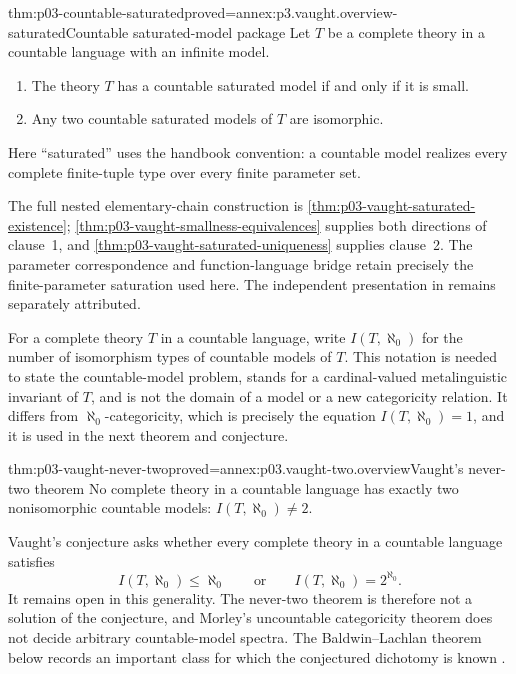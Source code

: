 \begin{hbtheorem}{thm:p03-countable-saturated}{proved=annex:p3.vaught.overview-saturated}{Countable saturated-model package}
Let \(T\) be a complete theory in a countable language with an infinite
model.
\begin{enumerate}
  \item The theory \(T\) has a countable saturated model if and only if it is
        small.
  \item Any two countable saturated models of \(T\) are isomorphic.
\end{enumerate}
Here ``saturated'' uses the handbook convention: a countable model realizes
every complete finite-tuple type over every finite parameter set.
\end{hbtheorem}

The full nested elementary-chain construction is
\cref{thm:p03-vaught-saturated-existence};
\cref{thm:p03-vaught-smallness-equivalences} supplies both directions of
clause~1, and \cref{thm:p03-vaught-saturated-uniqueness} supplies clause~2.
The parameter correspondence and function-language bridge retain precisely
the finite-parameter saturation used here. The independent presentation in
\cite{Marker2002} remains separately attributed.

For a complete theory \(T\) in a countable language, write
\(I(T,\aleph_0)\) for the number of isomorphism types of countable models of
\(T\).  This notation is needed to state the countable-model problem, stands
for a cardinal-valued metalinguistic invariant of \(T\), and is not the domain
of a model or a new categoricity relation.  It differs from
\(\aleph_0\)-categoricity, which is precisely the equation
\(I(T,\aleph_0)=1\), and it is used in the next theorem and conjecture.

\begin{hbtheorem}{thm:p03-vaught-never-two}{proved=annex:p03.vaught-two.overview}{Vaught's never-two theorem}
No complete theory in a countable language has exactly two nonisomorphic
countable models: \(I(T,\aleph_0)\ne2\).
\end{hbtheorem}

Vaught's conjecture asks whether every complete theory in a countable
language satisfies
\[
 I(T,\aleph_0)\leq\aleph_0
 \qquad\text{or}\qquad
 I(T,\aleph_0)=2^{\aleph_0}.
\]
It remains open in this generality.  The never-two theorem is therefore not a
solution of the conjecture, and Morley's uncountable categoricity theorem does
not decide arbitrary countable-model spectra.  The Baldwin--Lachlan theorem
below records an important class for which the conjectured dichotomy is known
\cite{Vaught1961,BaldwinLachlan1971,Marker2024}.

